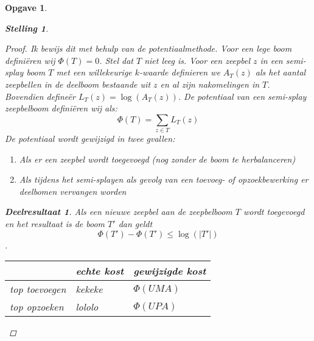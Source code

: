 \documentclass[12pt,hidelinks]{article}
\newtheorem{opgave}{Opgave}
\newtheorem{stelling}{Stelling}
\newtheorem{deelresultaat}{Deelresultaat}
\begin{document}
\begin{opgave}
\begin{description}
\begin{stelling}
                    \begin{proof}
                        Ik bewijs dit met behulp van de potentiaalmethode. Voor een lege boom definiëren wij $\Phi(T)=0$.
                        Stel dat $T$ niet leeg is. 
                        Voor een zeepbel $z$ in een semi-splay boom $T$ met een willekeurige $k$-waarde definieren we $A_T(z)$ als het aantal zeepbellen in de deelboom bestaande uit
                        $z$ en al zijn nakomelingen in $T$. Bovendien defineër $L_T(z) = \log(A_T(z))$.
                        De potentiaal van een semi-splay zeepbelboom definiëren wij als:
                        \begin{equation}
                            \Phi(T) = \sum _{z\in T}{L_T(z)}
                        \end{equation}
                        De potentiaal wordt gewijzigd in twee gvallen:
                        \begin{enumerate}[1.]
                            \item Als er een zeepbel wordt toegevoegd (nog zonder de boom te herbalanceren)
                            \item Als tijdens het semi-splayen als gevolg van een toevoeg- of opzoekbewerking er deelbomen vervangen worden
                        \end{enumerate}
                        \begin{deelresultaat}
                            Als een nieuwe zeepbel aan de zeepbelboom $T$ wordt toegevoegd en het resultaat is de boom $T'$ dan geldt $$\Phi(T')-\Phi(T')\le\log(|T'|)$$.
                        \end{deelresultaat}

                        \begin{center}
                            \begin{tabular}{ l | l | p{5cm} }
                                & echte kost & gewijzigde kost \\ \hline
                                top toevoegen & kekeke & $\Phi(U MA)$ \\ \hline
                                top opzoeken & lololo &  $\Phi(U PA)$
                            \end{tabular}
                        \end{center}
                    \end{proof}
                \end{stelling}
        \end{description}
    \end{opgave}
    \newpage
\end{document}
